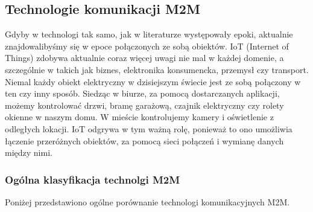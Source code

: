 \subsection{Technologie komunikacji M2M}
\hspace{1cm}Gdyby w technologi tak samo, jak w literaturze występowały epoki, aktualnie znajdowalibyśmy się w epoce połączonych ze sobą obiektów. IoT (Internet of Things) zdobywa aktualnie coraz więcej uwagi nie mal w każdej domenie, a szczególnie w takich jak biznes, elektronika konsumencka, przemysł czy transport. Niemal każdy obiekt elektryczny w dzisiejszym świecie jest ze sobą połączony w ten czy inny sposób. Siedząc w biurze, za pomocą dostarczanych aplikacji, możemy kontrolować drzwi, bramę garażową, czajnik elektryczny czy rolety okienne w naszym domu. W mieście kontrolujemy kamery i oświetlenie z odległych lokacji. IoT odgrywa w tym ważną rolę, ponieważ to ono umożliwia łączenie przeróżnych obiektów, za pomocą sieci połączeń i wymianę danych między nimi.\cite{LoRa-article}

\subsubsection{Ogólna klasyfikacja technolgi M2M}
\hspace{1cm}Poniżej przedstawiono ogólne porównanie technologi komunikacyjnych M2M.

